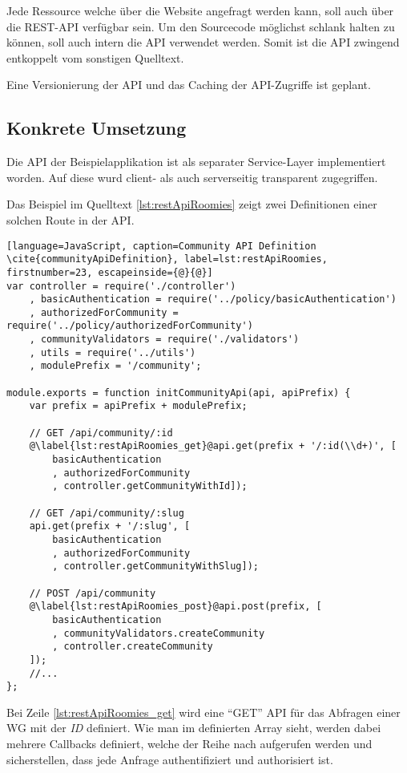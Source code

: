 Jede Ressource welche über die Website angefragt werden kann, soll auch über die REST-API verfügbar sein. Um den Sourcecode möglichst schlank halten zu können, soll auch intern die API verwendet werden.
Somit ist die API zwingend entkoppelt vom sonstigen Quelltext.

Eine Versionierung der API und das Caching der API-Zugriffe ist geplant.

\subsection*{Konkrete Umsetzung}
\label{sec:principle-rp1-rest-concrete-solution}
Die API der Beispielapplikation ist als separater Service-Layer implementiert worden. Auf diese wurd client- als auch serverseitig transparent zugegriffen.

Das Beispiel im Quelltext \ref{lst:restApiRoomies} zeigt zwei Definitionen einer solchen Route in der API.

\begin{lstlisting}[language=JavaScript, caption=Community API Definition \cite{communityApiDefinition}, label=lst:restApiRoomies, firstnumber=23, escapeinside={@}{@}]
var controller = require('./controller')
	, basicAuthentication = require('../policy/basicAuthentication')
	, authorizedForCommunity = require('../policy/authorizedForCommunity')
	, communityValidators = require('./validators')
	, utils = require('../utils')
	, modulePrefix = '/community';

module.exports = function initCommunityApi(api, apiPrefix) {
	var prefix = apiPrefix + modulePrefix;

	// GET /api/community/:id
	@\label{lst:restApiRoomies_get}@api.get(prefix + '/:id(\\d+)', [
		basicAuthentication
		, authorizedForCommunity
		, controller.getCommunityWithId]);

	// GET /api/community/:slug
	api.get(prefix + '/:slug', [
		basicAuthentication
		, authorizedForCommunity
		, controller.getCommunityWithSlug]);

	// POST /api/community
	@\label{lst:restApiRoomies_post}@api.post(prefix, [
		basicAuthentication
		, communityValidators.createCommunity
		, controller.createCommunity
	]);
	//...
};
\end{lstlisting}

Bei Zeile \autoref{lst:restApiRoomies_get} wird eine ``GET'' API für das Abfragen einer WG mit der \emph{ID} definiert. Wie man im definierten Array sieht, werden dabei mehrere Callbacks definiert, welche der Reihe nach aufgerufen werden und sicherstellen, dass jede Anfrage authentifiziert und authorisiert ist.

